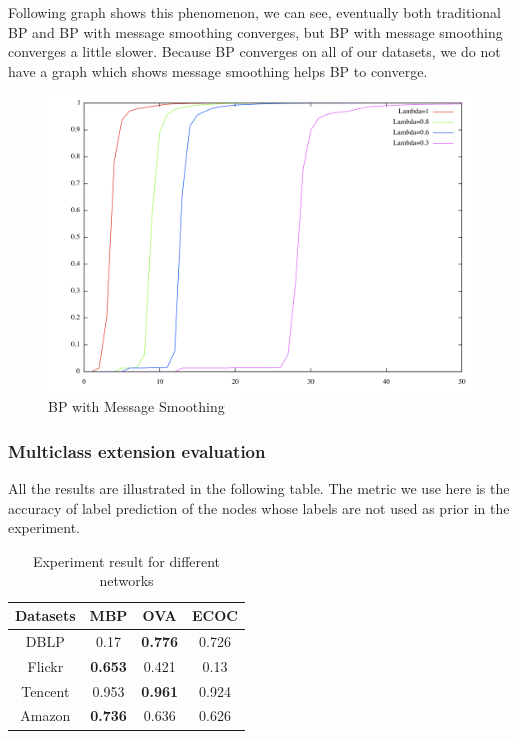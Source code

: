 Following graph shows this phenomenon, we can see, eventually both traditional BP and BP with message smoothing converges, but BP with message smoothing converges a little slower. Because BP converges on all of our datasets, we do not have a graph which shows message smoothing helps BP to converge.

\begin{figure}[!ht]
\centering
\begin{minipage}[b]{0.5\linewidth}
\centering
\includegraphics[width=\textwidth]{FIG/smooth.png}
\caption{BP with Message Smoothing}
\end{minipage}
\end{figure}

\subsubsection{Multiclass extension evaluation}
All the results are illustrated in the following table. The metric we use here is the accuracy of label prediction of the nodes whose labels are not used as prior in the experiment.
\begin{table}[!ht]
\centering
\begin{tabular}{c|ccc}
\toprule
\textbf{Datasets} & \textbf{MBP} & \textbf{OVA} & \textbf{ECOC}\\
\midrule
DBLP &0.17 &\textbf{0.776} &0.726\\
Flickr & \textbf{0.653} & 0.421 & 0.13\\
Tencent & 0.953 & \textbf{0.961} & 0.924\\
Amazon & \textbf{0.736} & 0.636 & 0.626\\
\bottomrule
\end{tabular}
\caption{Experiment result for different networks}
\end{table}

